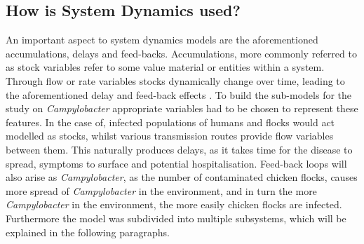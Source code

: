 \subsection{How is System Dynamics used?}
An important aspect to system dynamics models are the aforementioned accumulations, delays and feed-backs. Accumulations, more commonly referred to as stock variables refer to some value material or entities within a system. Through flow or rate variables stocks dynamically change over time, leading to the aforementioned delay and feed-back effects \parencite{sterman_system_2001}. To build the sub-models for the study on \textit{Campylobacter} appropriate variables had to be chosen to represent these features. In the case of, infected populations of humans and flocks would act modelled as stocks, whilst various transmission routes provide flow variables between them. This naturally produces delays, as it takes time for the disease to spread, symptoms to surface and potential hospitalisation. Feed-back loops will also arise as \textit{Campylobacter}, as the number of contaminated chicken flocks, causes more spread of \textit{Campylobacter} in the environment, and in turn the more \textit{Campylobacter} in the environment, the more easily chicken flocks are infected. Furthermore the model was subdivided into multiple subsystems, which will be explained in the following paragraphs. 


